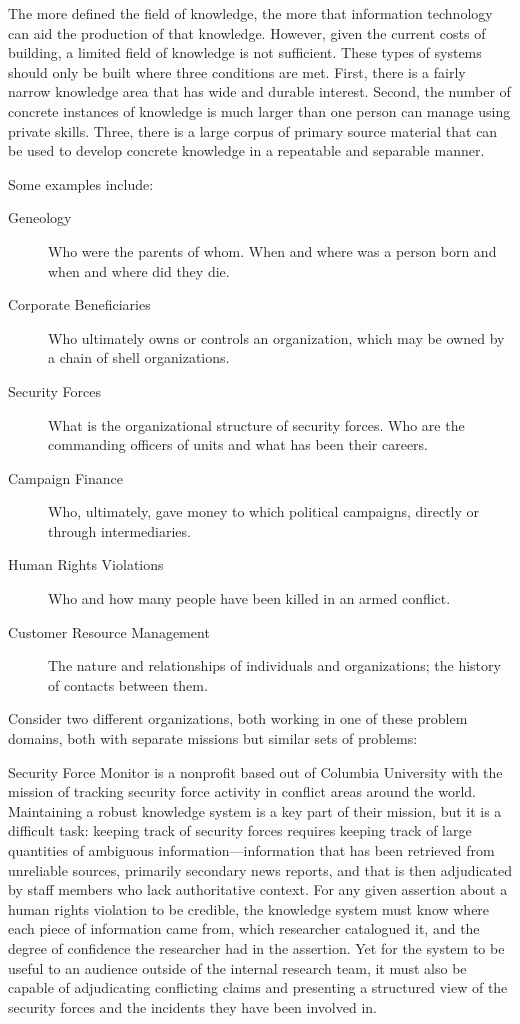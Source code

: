 \documentclass[format=siggraph, review=true]{acmart}
\begin{document}
The more defined the field of knowledge, the more that information
technology can aid the production of that knowledge. However, given
the current costs of building, a limited field of knowledge is not
sufficient. These types of systems should only be built where three
conditions are met. First, there is a fairly narrow knowledge area that
has wide and durable interest. Second, the number of concrete instances
of knowledge is much larger than one person can manage using private
skills. Three, there is a large corpus of primary source material that
can be used to develop concrete knowledge in a repeatable and
separable manner.

Some examples include:

\begin{description}
  \item [Geneology] Who were the parents of whom. When and where was a person
    born and when and where did they die.
  \item [Corporate Beneficiaries] Who ultimately owns or controls an
    organization, which may be owned by a chain of shell organizations.
  \item [Security Forces] What is the organizational structure of
    security forces. Who are the commanding officers of units and
    what has been their careers.
  \item [Campaign Finance] Who, ultimately, gave money to which
    political campaigns, directly or through intermediaries.
  \item [Human Rights Violations] Who and how many people have been
    killed in an armed conflict.
  \item [Customer Resource Management] The nature and relationships of individuals and organizations; the history of contacts between them. 
\end{description}

Consider two different organizations, both working in one of these problem
domains, both with separate missions but similar sets of problems:

Security Force Monitor is a nonprofit based out of Columbia University
with the mission of tracking security force activity in conflict areas
around the world. Maintaining a robust knowledge system is a key part of
their mission, but it is a difficult task: keeping track of security forces
requires keeping track of large quantities of ambiguous
information—information that has been retrieved from unreliable sources,
primarily secondary news reports, and that is then adjudicated by staff
members who lack authoritative context. For any given assertion about a
human rights violation to be credible, the knowledge system must know
where each piece of information came from, which researcher catalogued it,
and the degree of confidence the researcher had in the assertion. Yet for
the system to be useful to an audience outside of the internal research
team, it must also be capable of adjudicating conflicting claims and
presenting a structured view of the security forces and the incidents
they have been involved in.
\end{document}
